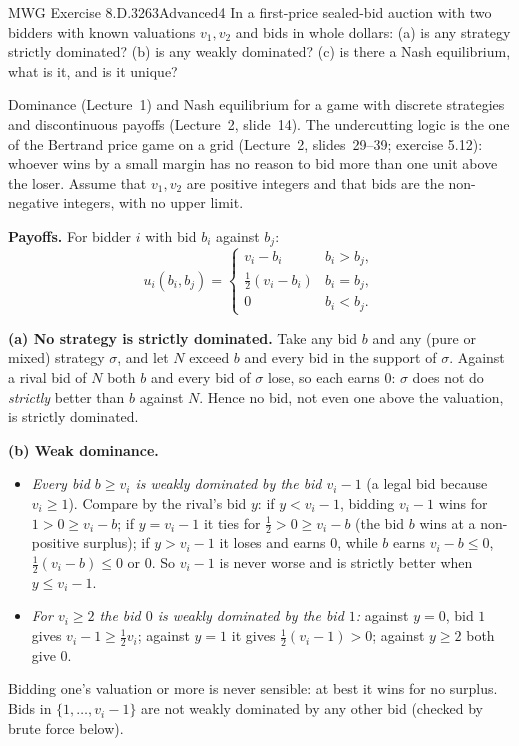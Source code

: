 \begin{exsol}{MWG Exercise 8.D.3}{263}{Advanced}{4}
\asked In a first-price sealed-bid auction with two bidders with known valuations $v_1, v_2$ and
bids in whole dollars: (a) is any strategy strictly dominated? (b) is any weakly dominated?
(c) is there a Nash equilibrium, what is it, and is it unique?

\method Dominance (Lecture~1) and Nash equilibrium for a game with discrete strategies and
discontinuous payoffs (Lecture~2, slide~14). The undercutting logic is the one of the Bertrand
price game on a grid (Lecture~2, slides~29--39; exercise 5.12): whoever wins by a small margin has no
reason to bid more than one unit above the loser. Assume that $v_1, v_2$ are positive integers and
that bids are the non-negative integers, with no upper limit.

\solution
\textbf{Payoffs.} For bidder $i$ with bid $b_i$ against $b_j$:
\[
  u_i(b_i, b_j) = \begin{cases} v_i - b_i & b_i > b_j,\\[2pt] \tfrac12 (v_i - b_i) & b_i = b_j,\\[2pt] 0 & b_i < b_j.\end{cases}
\]

\textbf{(a) No strategy is strictly dominated.} Take any bid $b$ and any (pure or mixed) strategy
$\sigma$, and let $N$ exceed $b$ and every bid in the support of $\sigma$. Against a rival bid of $N$
both $b$ and every bid of $\sigma$ lose, so each earns $0$: $\sigma$ does not do \emph{strictly} better
than $b$ against $N$. Hence no bid, not even one above the valuation, is strictly dominated.

\textbf{(b) Weak dominance.}
\begin{itemize}
  \item \emph{Every bid $b \ge v_i$ is weakly dominated by the bid $v_i - 1$} (a legal bid because $v_i \ge 1$).
  Compare by the rival's bid $y$: if $y < v_i - 1$, bidding $v_i - 1$ wins for $1 > 0 \ge v_i - b$; if $y = v_i - 1$ it
  ties for $\tfrac12 > 0 \ge v_i - b$ (the bid $b$ wins at a non-positive surplus); if $y > v_i - 1$ it loses and earns $0$,
  while $b$ earns $v_i - b \le 0$, $\tfrac12(v_i - b) \le 0$ or $0$. So $v_i - 1$ is never worse and is
  strictly better when $y \le v_i - 1$.
  \item \emph{For $v_i \ge 2$ the bid $0$ is weakly dominated by the bid $1$:} against $y = 0$, bid $1$ gives $v_i - 1 \ge \tfrac12 v_i$;
  against $y = 1$ it gives $\tfrac12 (v_i - 1) > 0$; against $y \ge 2$ both give $0$.
\end{itemize}
Bidding one's valuation or more is never sensible: at best it wins for no surplus. Bids in $\{1, \dots, v_i - 1\}$
are not weakly dominated by any other bid (checked by brute force below).


\end{exsol}
